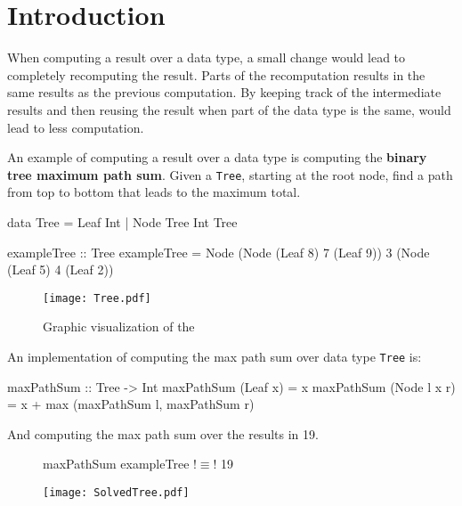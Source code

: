 \newpage
\section{Introduction}
When computing a result over a data type, a small change would lead to completely recomputing the result. Parts of the recomputation results in the same results as the previous computation. By keeping track of the intermediate results and then reusing the result when part of the data type is the same, would lead to less computation. 

An example of computing a result over a data type is computing the \textbf{binary tree maximum path sum}. Given a \texttt{Tree}, starting at the root node, find a path from top to bottom that leads to the maximum total.
\begin{haskell}
data Tree = Leaf Int
          | Node Tree Int Tree 
\end{haskell}

\begin{haskell}
exampleTree :: Tree    
exampleTree = Node (Node (Leaf 8) 7 (Leaf 9)) 3 (Node (Leaf 5) 4 (Leaf 2))
\end{haskell}

\begin{figure}[H]
    \centering
    \texttt{[image: Tree.pdf]}
    \caption{Graphic visualization of the }
\end{figure}

An implementation of computing the max path sum over data type \texttt{Tree} is:

\begin{haskell}
maxPathSum :: Tree -> Int
maxPathSum (Leaf x)     = x
maxPathSum (Node l x r) = x + max (maxPathSum l, maxPathSum r)
\end{haskell}

\newpage
And computing the max path sum over the  results in 19.

\begin{figure}[H]
\begin{minipage}[c]{0.35\textwidth}
\begin{haskell}
maxPathSum exampleTree !$\equiv$! 19
\end{haskell}
\end{minipage}
\hspace{0.1\textwidth}
\begin{minipage}[c]{0.55\textwidth}
\texttt{[image: SolvedTree.pdf]}
\end{minipage}
\end{figure}

